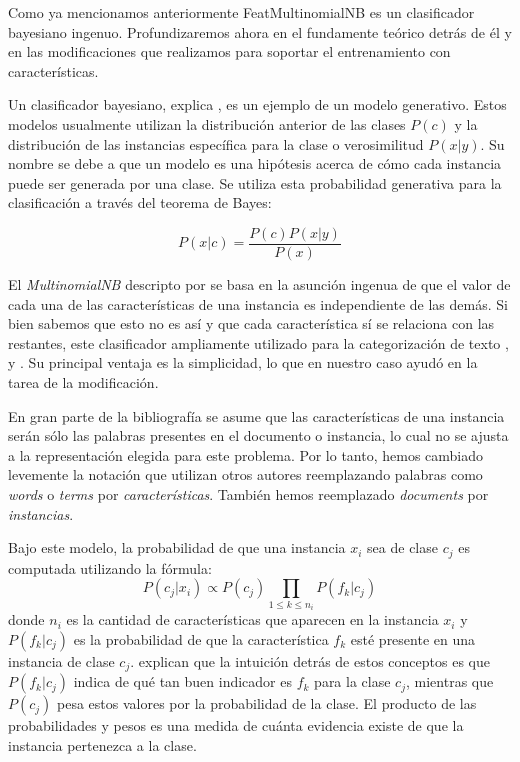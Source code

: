 Como ya mencionamos anteriormente FeatMultinomialNB es un clasificador bayesiano ingenuo. Profundizaremos ahora en el fundamente teórico detrás de él y en las modificaciones que realizamos para soportar el entrenamiento con características.

Un clasificador bayesiano, explica \citet{libro-abney}, es un ejemplo de un modelo generativo. Estos modelos usualmente utilizan la distribución anterior de las clases $P(c)$ y la distribución de las instancias específica para la clase o verosimilitud $P(x|y)$. Su nombre se debe a que un modelo es una hipótesis acerca de cómo cada instancia puede ser generada por una clase. Se utiliza esta probabilidad generativa para la clasificación a través del teorema de Bayes:

$$P(x|c) = \frac{P(c)P(x|y)}{P(x)}$$

El \textit{MultinomialNB} descripto por \citet{multinomial-manning} se basa en la asunción ingenua de que el valor de cada una de las características de una instancia es independiente de las demás. Si bien sabemos que esto no es así y que cada característica sí se relaciona con las restantes, este clasificador ampliamente utilizado para la categorización de texto \citet{dualist}, \citet{multinomialnb-comparision-mccallum} y \citet{multinomialnb-unbalanced}. Su principal ventaja es la simplicidad, lo que en nuestro caso ayudó en la tarea de la modificación.

En gran parte de la bibliografía se asume que las características de una instancia serán sólo las palabras presentes en el documento o instancia, lo cual no se ajusta a la representación elegida para este problema. Por lo tanto, hemos cambiado levemente la notación que utilizan otros autores reemplazando palabras como \textit{words} o \textit{terms} por \textit{características}. También hemos reemplazado \textit{documents} por \textit{instancias}.

Bajo este modelo, la probabilidad de que una instancia $x_i$ sea de clase $c_j$ es computada utilizando la fórmula:
\begin{equation}\label{eq-mnb-prob}
    P(c_j|x_i) \propto P(c_j) \prod_{1\leq k \leq n_i}P(f_k|c_j)
\end{equation}
donde $n_i$ es la cantidad de características que aparecen en la instancia $x_i$ y $P(f_k|c_j)$ es la probabilidad de que la característica $f_k$ esté presente en una instancia de clase $c_j$. \citet{multinomial-manning} explican que la intuición detrás de estos conceptos es que $P(f_k|c_j)$ indica de qué tan buen indicador es $f_k$ para la clase $c_j$, mientras que $P(c_j)$ pesa estos valores por la probabilidad de la clase. El producto de las probabilidades y pesos es una medida de cuánta evidencia existe de que la instancia pertenezca a la clase.

